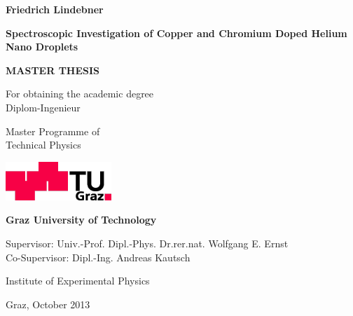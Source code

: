 \begin{titlepage}
\begin{center}
{\large \textbf{Friedrich Lindebner}}

\vspace{1.5cm}

\begin{Large}
\textbf{Spectroscopic Investigation of Copper and Chromium Doped Helium Nano Droplets}
\end{Large}

\vspace{1cm}

{\Large \textbf{MASTER THESIS}}

\vspace{0.5cm}

For obtaining the academic degree \\
Diplom-Ingenieur

\vspace{0.5cm}

Master Programme of \\
Technical Physics

\vspace{2cm}

\includegraphics{logo-tu.png}

\textbf{Graz University of Technology}

\vspace{1.5cm}

Supervisor: Univ.-Prof. Dipl.-Phys. Dr.rer.nat. Wolfgang E. Ernst \\
Co-Supervisor: Dipl.-Ing. Andreas Kautsch

\vspace{1cm}

Institute of Experimental Physics

Graz, October 2013

\end{center}
\end{titlepage}
